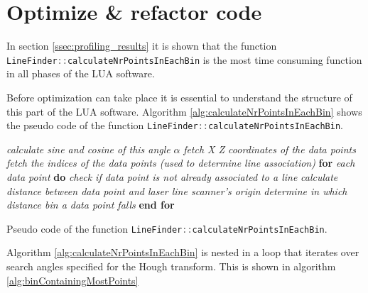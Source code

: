 \section{Optimize \& refactor code} \label{sec:optimize}
In section \ref{ssec:profiling_results} it is shown that the function \lstinline[language=c]|LineFinder::calculateNrPointsInEachBin| is the most time consuming function in all phases of the LUA software.

Before optimization can take place it is essential to understand the structure of this part of the LUA software. Algorithm \ref{alg:calculateNrPointsInEachBin} shows the pseudo code of the function \lstinline[language=c]|LineFinder::calculateNrPointsInEachBin|.

\begin{algorithm}
    \begin{algorithmic}[1]
        \State \textit{calculate sine and cosine of this angle} $\alpha$
        \State \textit{fetch X Z coordinates of the data points}
        \State \textit{fetch the indices of the data points (used to determine line association)}
        \State \textbf{for} \textit{each data point} \textbf{do}
        \State \hspace{1cm} \textit{check if data point is not already associated to a line}
        \State \hspace{1cm} \textit{calculate distance between data point and laser line scanner's origin}
        \State \hspace{1cm} \textit{determine in which distance bin a data point falls}
        \State \textbf{end for}
        \EndFunction
    \end{algorithmic}
    \caption{Pseudo code of the function \lstinline[language=c]|LineFinder::calculateNrPointsInEachBin|.}
    \label{alg:calculateNrPointsInEachBin}
\end{algorithm}

Algorithm \ref{alg:calculateNrPointsInEachBin} is nested in a loop that iterates over search angles specified for the Hough transform. This is shown in algorithm \ref{alg:binContainingMostPoints}

